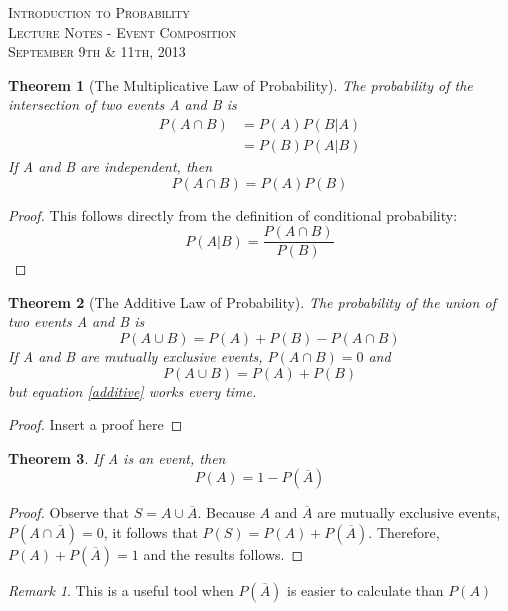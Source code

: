 \documentclass{article}
\theoremstyle{theorem}
\newtheorem{thm}{Theorem}
\theoremstyle{remark}
\newtheorem*{rmk}{Remark}
\newcommand{\classname}{
Introduction to Probability
}
\begin{document}
\begin{center}
\textsc{\Large \classname}\\[.3cm]
\textsc{\Large Lecture Notes - Event Composition}\\[.3cm]
\textsc{\large September 9th \& 11th, 2013}\\[1cm]
\end{center}

\begin{thm}[The Multiplicative Law of Probability]
  The probability of the intersection of two events A and B is
  \begin{align}
    P(A \cap B) &= P(A) P(B|A)\\
                &= P(B) P(A|B)
  \end{align}
  If A and B are independent, then
  $$
  P(A \cap B) = P(A) P(B)
  $$
\end{thm}
\begin{proof}
This follows directly from the definition of conditional probability:
\begin{equation} \label{cond}
  P(A|B) = \frac{P(A \cap B)}{P(B)}
\end{equation}
\end{proof}
\begin{thm}[The Additive Law of Probability]
  The probability of the union of two events A and B is
  \begin{equation} \label{additive}
    P(A \cup B) = P(A) + P(B) - P(A \cap B)
  \end{equation}
  If A and B are mutually exclusive events, $P(A \cap B) = 0$ and
  \begin{equation} \label{additive-excl}
    P(A \cup B) = P(A) + P(B)
  \end{equation}
  but equation \ref{additive} works every time.
\end{thm}

\begin{proof}
Insert a proof here
\end{proof}

\begin{thm}
  If A is an event, then
  \begin{equation}
    P(A) = 1 - P(\overline{A})
  \end{equation}
\end{thm}
\begin{proof}
Observe that $S = A \cup \overline{A}$. Because $A$ and $\overline{A}$ are mutually exclusive events, $P(A \cap \overline{A}) = 0$, it follows that $P(S) = P(A) + P(\overline{A})$. Therefore, $P(A) + P(\overline{A}) = 1$ and the results follows.
\end{proof}

\begin{rmk}
This is a useful tool when $P(\overline{A})$ is easier to calculate than $P(A)$
\end{rmk}
\end{document}
